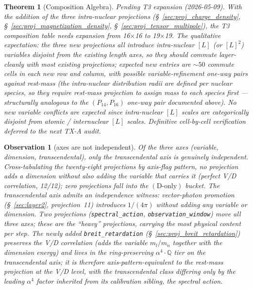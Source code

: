 \documentclass[11pt]{article}
\newtheorem{observation}{Observation}
\newtheorem{theorem}{Theorem}
\begin{document}
\begin{theorem}[Composition Algebra]
\textit{Pending T3 expansion (2026-05-09).}  With the addition of
the three intra-nuclear projections
(\S~\ref{sec:proj_charge_density},
\S~\ref{sec:proj_magnetization_density},
\S~\ref{sec:proj_tensor_multipole}), the T3 composition table needs
expansion from 16$\times$16 to 19$\times$19.  The qualitative
expectation: the three new projections all introduce intra-nuclear
$[L]$ (or $[L]^2$) variables disjoint from the existing length
axes, so they should commute layer-cleanly with most existing
projections; expected new entries are $\sim 50$ commute cells in
each new row and column, with possible variable-refinement one-way
pairs against rest-mass (the intra-nuclear distribution radii are
defined per nuclear species, so they require rest-mass projection
to assign mass to each species first --- structurally analogous to
the $(P_{14}, P_{16})$ one-way pair documented above).  No new
variable conflicts are expected since intra-nuclear $[L]$ scales
are categorically disjoint from atomic / internuclear $[L]$ scales.
Definitive cell-by-cell verification deferred to the next TX-A
audit.
\end{theorem}

\begin{observation}[axes are not independent]
\label{obs:axes_correlated}
Of the three axes (variable, dimension, transcendental), only the
transcendental axis is genuinely independent.  Cross-tabulating the
twenty-eight projections by axis-flag pattern, no projection adds a
dimension without also adding the variable that carries it (perfect
V/D correlation, 12/12); zero projections fall into the
$(\text{D-only})$ bucket.  The transcendental axis admits an
independence witness: vector-photon promotion (\S~\ref{sec:layer2},
projection~11) introduces $1/(4\pi)$ without adding any variable
or dimension.  Two projections (\texttt{spectral\_action},
\texttt{observation\_window}) move all three axes; these are the
``heavy'' projections, carrying the most physical content per step.
The newly added \texttt{breit\_retardation}
(\S~\ref{sec:proj_breit_retardation}) preserves the V/D correlation
(adds the variable $m_l/m_n$ together with the dimension energy)
and lives in the ring-preserving $\alpha^4 \cdot \mathbb{Q}$ tier on
the transcendental axis; it is therefore axis-pattern-equivalent to
the rest-mass projection at the V/D level, with the transcendental
class differing only by the leading $\alpha^4$ factor inherited from
its calibration sibling, the spectral action.
\end{observation}
\end{document}
